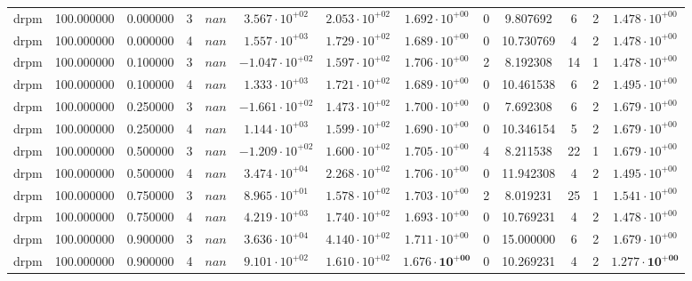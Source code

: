 \begin{table}
\begin{tabular}{ccccccccccccc}
drpm & 100.000000 & 0.000000 & 3 & $nan$ & $3.567 \cdot 10^{+02}$ & $2.053 \cdot 10^{+02}$ & $1.692 \cdot 10^{+00}$ & 0 & 9.807692 & 6 & 2 & $1.478 \cdot 10^{+00}$ \\
drpm & 100.000000 & 0.000000 & 4 & $nan$ & $1.557 \cdot 10^{+03}$ & $1.729 \cdot 10^{+02}$ & $1.689 \cdot 10^{+00}$ & 0 & 10.730769 & 4 & 2 & $1.478 \cdot 10^{+00}$ \\
drpm & 100.000000 & 0.100000 & 3 & $nan$ & $-1.047 \cdot 10^{+02}$ & $1.597 \cdot 10^{+02}$ & $1.706 \cdot 10^{+00}$ & 2 & 8.192308 & 14 & 1 & $1.478 \cdot 10^{+00}$ \\
drpm & 100.000000 & 0.100000 & 4 & $nan$ & $1.333 \cdot 10^{+03}$ & $1.721 \cdot 10^{+02}$ & $1.689 \cdot 10^{+00}$ & 0 & 10.461538 & 6 & 2 & $1.495 \cdot 10^{+00}$ \\
drpm & 100.000000 & 0.250000 & 3 & $nan$ & $-1.661 \cdot 10^{+02}$ & $1.473 \cdot 10^{+02}$ & $1.700 \cdot 10^{+00}$ & 0 & 7.692308 & 6 & 2 & $1.679 \cdot 10^{+00}$ \\
drpm & 100.000000 & 0.250000 & 4 & $nan$ & $1.144 \cdot 10^{+03}$ & $1.599 \cdot 10^{+02}$ & $1.690 \cdot 10^{+00}$ & 0 & 10.346154 & 5 & 2 & $1.679 \cdot 10^{+00}$ \\
drpm & 100.000000 & 0.500000 & 3 & $nan$ & $-1.209 \cdot 10^{+02}$ & $1.600 \cdot 10^{+02}$ & $1.705 \cdot 10^{+00}$ & 4 & 8.211538 & 22 & 1 & $1.679 \cdot 10^{+00}$ \\
drpm & 100.000000 & 0.500000 & 4 & $nan$ & $3.474 \cdot 10^{+04}$ & $2.268 \cdot 10^{+02}$ & $1.706 \cdot 10^{+00}$ & 0 & 11.942308 & 4 & 2 & $1.495 \cdot 10^{+00}$ \\
drpm & 100.000000 & 0.750000 & 3 & $nan$ & $8.965 \cdot 10^{+01}$ & $1.578 \cdot 10^{+02}$ & $1.703 \cdot 10^{+00}$ & 2 & 8.019231 & 25 & 1 & $1.541 \cdot 10^{+00}$ \\
drpm & 100.000000 & 0.750000 & 4 & $nan$ & $4.219 \cdot 10^{+03}$ & $1.740 \cdot 10^{+02}$ & $1.693 \cdot 10^{+00}$ & 0 & 10.769231 & 4 & 2 & $1.478 \cdot 10^{+00}$ \\
drpm & 100.000000 & 0.900000 & 3 & $nan$ & $3.636 \cdot 10^{+04}$ & $4.140 \cdot 10^{+02}$ & $1.711 \cdot 10^{+00}$ & 0 & 15.000000 & 6 & 2 & $1.679 \cdot 10^{+00}$ \\
drpm & 100.000000 & 0.900000 & 4 & $nan$ & $9.101 \cdot 10^{+02}$ & $1.610 \cdot 10^{+02}$ & $\mathbf{1.676 \cdot 10^{+00}}$ & 0 & 10.269231 & 4 & 2 & $\mathbf{1.277 \cdot 10^{+00}}$ \\
\bottomrule
\end{tabular}
\end{table}
